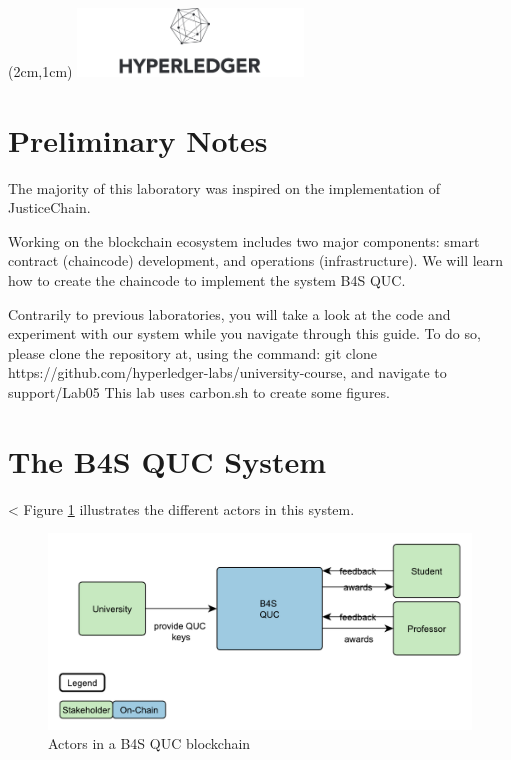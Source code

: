 \documentclass[12pt,a4paper]{article}
\theoremstyle{definition}
\begin{document}
\textblockorigin{-34pt}{-12pt}
\begin{textblock*}{10cm}(2cm,1cm)
\includegraphics[width=6cm]{hyperledger.png}
\end{textblock*}
\newtheorem{mydef}{Definition}

\section*{Preliminary Notes}


The majority of this laboratory was inspired on the implementation of JusticeChain\cite{belchior2019_audits}.



Working on the blockchain ecosystem includes two major components: smart contract (chaincode) development, and operations (infrastructure). We will learn how to create the chaincode to implement the system B4S QUC.  

Contrarily to previous laboratories, you will take a look at the code and experiment with our system while you navigate through this guide.
To do so, please clone the repository at, using the command:
{git clone https://github.com/hyperledger-labs/university-course}, and navigate to support/Lab05
This lab uses carbon.sh to create some figures.




\section{The B4S QUC System}
<
Figure \ref{fig:actors} illustrates the different actors in this system.

\begin{figure}[h]
    \centering
    \includegraphics[scale=0.6]{figures/fig1.pdf}
    \caption{Actors in a B4S QUC blockchain}
    \label{fig:actors}
\end{figure}
\end{document}
